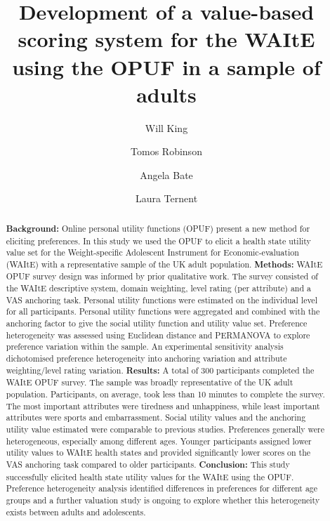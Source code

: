 \documentclass[
  number,
  preprint]{elsarticle}
\begin{document}
\begin{frontmatter}
\title{Development of a value-based scoring system for the WAItE using
the OPUF in a sample of adults}
\author[1]{Will King%
%
}
\author[1]{Tomos Robinson%
%
}

\author[2]{Angela Bate%
%
}

\author[1]{Laura Ternent%
%
}







        
\begin{abstract}
\textbf{Background:} Online personal utility functions (OPUF) present a
new method for eliciting preferences. In this study we used the OPUF to
elicit a health state utility value set for the Weight-specific
Adolescent Instrument for Economic-evaluation (WAItE) with a
representative sample of the UK adult population. \textbf{Methods:}
WAItE OPUF survey design was informed by prior qualitative work. The
survey consisted of the WAItE descriptive system, domain weighting,
level rating (per attribute) and a VAS anchoring task. Personal utility
functions were estimated on the individual level for all participants.
Personal utility functions were aggregated and combined with the
anchoring factor to give the social utility function and utility value
set. Preference heterogeneity was assessed using Euclidean distance and
PERMANOVA to explore preference variation within the sample. An
experimental sensitivity analysis dichotomised preference heterogeneity
into anchoring variation and attribute weighting/level rating variation.
\textbf{Results:} A total of 300 participants completed the WAItE OPUF
survey. The sample was broadly representative of the UK adult
population. Participants, on average, took less than 10 minutes to
complete the survey. The most important attributes were tiredness and
unhappiness, while least important attributes were sports and
embarrassment. Social utility values and the anchoring utility value
estimated were comparable to previous studies. Preferences generally
were heterogeneous, especially among different ages. Younger
participants assigned lower utility values to WAItE health states and
provided significantly lower scores on the VAS anchoring task compared
to older participants. \textbf{Conclusion:} This study successfully
elicited health state utility values for the WAItE using the OPUF.
Preference heterogeneity analysis identified differences in preferences
for different age groups and a further valuation study is ongoing to
explore whether this heterogeneity exists between adults and
adolescents.
\end{abstract}






\end{frontmatter}
\end{document}
